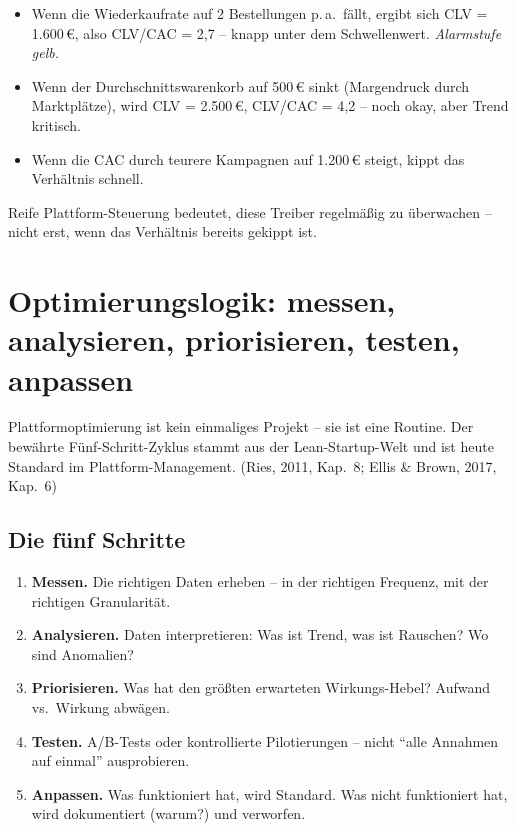 \documentclass[11pt,a4paper,oneside]{article}
\newcommand{\fachbegriff}[1]{\textbf{#1}}
\newcommand{\quelle}[1]{{\footnotesize\color{lpGray}(#1)}}
\begin{document}
\begin{itemize}
  \item Wenn die Wiederkaufrate auf 2 Bestellungen p.\,a.\ fällt, ergibt sich CLV = 1.600\,\euro{}, also CLV/CAC = 2{,}7 -- knapp unter dem Schwellenwert. \emph{Alarmstufe gelb.}
  \item Wenn der Durchschnittswarenkorb auf 500\,\euro{} sinkt (Margendruck durch Marktplätze), wird CLV = 2.500\,\euro{}, CLV/CAC = 4{,}2 -- noch okay, aber Trend kritisch.
  \item Wenn die CAC durch teurere Kampagnen auf 1.200\,\euro{} steigt, kippt das Verhältnis schnell.
\end{itemize}

Reife Plattform-Steuerung bedeutet, diese Treiber regelmäßig zu überwachen -- nicht erst, wenn das Verhältnis bereits gekippt ist.

\section{Optimierungslogik: messen, analysieren, priorisieren, testen, anpassen}

Plattformoptimierung ist kein einmaliges Projekt -- sie ist eine Routine. Der bewährte Fünf-Schritt-Zyklus stammt aus der Lean-Startup-Welt und ist heute Standard im Plattform-Management. \quelle{Ries, 2011, Kap.~8; Ellis \& Brown, 2017, Kap.~6}

\subsection{Die fünf Schritte}

\begin{enumerate}
  \item \fachbegriff{Messen.} Die richtigen Daten erheben -- in der richtigen Frequenz, mit der richtigen Granularität.
  \item \fachbegriff{Analysieren.} Daten interpretieren: Was ist Trend, was ist Rauschen? Wo sind Anomalien?
  \item \fachbegriff{Priorisieren.} Was hat den größten erwarteten Wirkungs-Hebel? Aufwand vs.\ Wirkung abwägen.
  \item \fachbegriff{Testen.} A/B-Tests oder kontrollierte Pilotierungen -- nicht ``alle Annahmen auf einmal'' ausprobieren.
  \item \fachbegriff{Anpassen.} Was funktioniert hat, wird Standard. Was nicht funktioniert hat, wird dokumentiert (warum?) und verworfen.
\end{enumerate}
\end{document}
